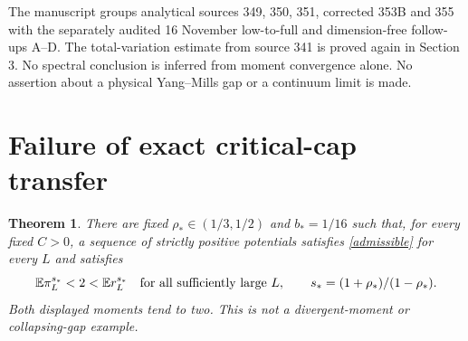 \documentclass[11pt]{article}
\newcommand{\E}{\mathbb E}
\newtheorem{theorem}{Theorem}[section]
\begin{document}
The manuscript groups analytical sources 349, 350, 351, corrected 353B and 355 with the separately audited 16 November low-to-full and dimension-free follow-ups A--D. The total-variation estimate from source 341 is proved again in Section 3. No spectral conclusion is inferred from moment convergence alone. No assertion about a physical Yang--Mills gap or a continuum limit is made.

\section{Failure of exact critical-cap transfer}
\begin{theorem}\label{capfailure}
There are fixed $\rho_*\in(1/3,1/2)$ and $b_*=1/16$ such that, for every fixed $C>0$, a sequence of strictly positive potentials satisfies \eqref{admissible} for every $L$ and satisfies
\[
 \E\pi_L^{s_*}<2<\E r_L^{s_*}
 \quad\hbox{for all sufficiently large }L,
 \qquad s_*=(1+\rho_*)/(1-\rho_*).
\]
Both displayed moments tend to two. This is not a divergent-moment or collapsing-gap example.
\end{theorem}
\end{document}
